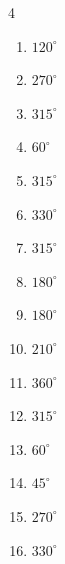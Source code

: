 \begin{multicols}{4}
\begin{enumerate}
  \item $\displaystyle 120^{\circ}$

  \item $\displaystyle 270^{\circ}$

  \item $\displaystyle 315^{\circ}$

  \item $\displaystyle 60^{\circ}$

  \item $\displaystyle 315^{\circ}$

  \item $\displaystyle 330^{\circ}$

  \item $\displaystyle 315^{\circ}$

  \item $\displaystyle 180^{\circ}$
        \phantom{$\displaystyle =\pi$}

  \item $\displaystyle 180^{\circ}$
        \phantom{$\displaystyle =\pi$}

  \item $\displaystyle 210^{\circ}$

  \item $\displaystyle 360^{\circ}$
        \phantom{$\displaystyle =2\pi$}

  \item $\displaystyle 315^{\circ}$

  \item $\displaystyle 60^{\circ}$

\columnbreak %

  \item $\displaystyle 45^{\circ}$

  \item $\displaystyle 270^{\circ}$

  \item $\displaystyle 330^{\circ}$


\end{enumerate}
\end{multicols}
